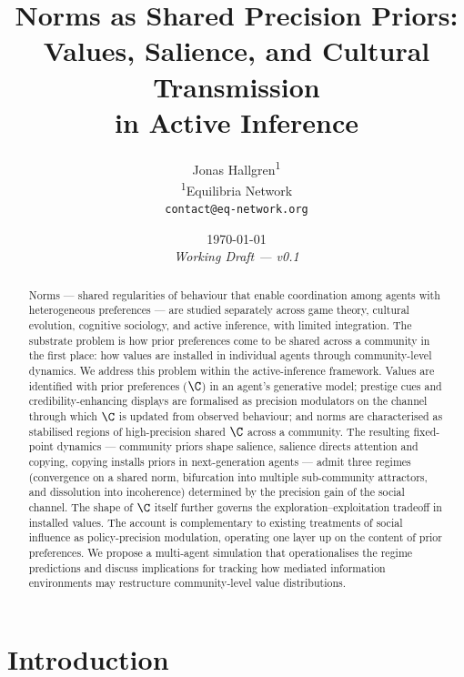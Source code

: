 \documentclass[11pt,a4paper]{article}
\title{\textbf{Norms as Shared Precision Priors: \\[0.3em]
Values, Salience, and Cultural Transmission \\[0.3em]
in Active Inference}}
\author{Jonas Hallgren\textsuperscript{1} \\
\textsuperscript{1}Equilibria Network \\
\texttt{contact@eq-network.org}}
\date{\today \\ \textit{Working Draft --- v0.1}}
\begin{document}
\maketitle

\begin{abstract}
Norms --- shared regularities of behaviour that enable coordination among
agents with heterogeneous preferences --- are studied separately across game
theory, cultural evolution, cognitive sociology, and active inference, with
limited integration. The substrate problem is how prior preferences come to be
shared across a community in the first place: how values are installed in
individual agents through community-level dynamics. We address this problem
within the active-inference framework. Values are identified with prior
preferences ($\C$) in an agent's generative model; prestige cues and
credibility-enhancing displays are formalised as precision modulators on the
channel through which $\C$ is updated from observed behaviour; and norms are
characterised as stabilised regions of high-precision shared $\C$ across a
community. The resulting fixed-point dynamics --- community priors shape
salience, salience directs attention and copying, copying installs priors in
next-generation agents --- admit three regimes (convergence on a shared norm,
bifurcation into multiple sub-community attractors, and dissolution into
incoherence) determined by the precision gain of the social channel. The
shape of $\C$ itself further governs the exploration--exploitation tradeoff
in installed values. The account is complementary to existing treatments of
social influence as policy-precision modulation, operating one layer up on
the content of prior preferences. We propose a multi-agent simulation that
operationalises the regime predictions and discuss implications for tracking
how mediated information environments may restructure community-level value
distributions.
\end{abstract}

\section{Introduction}
\label{sec:intro}
\end{document}
